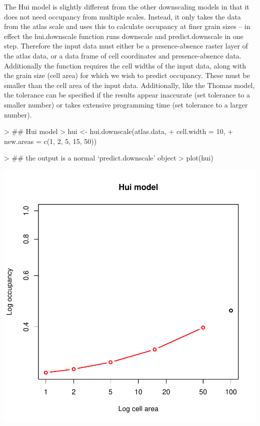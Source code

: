 \documentclass{article}[12pt, a4paper]
\begin{document}
The Hui model is slightly different from the other downscaling models in that it does not need occupancy from multiple scales. Instead, it only takes the data from the atlas scale and uses this to calculate occupancy at finer grain sizes – in effect the hui.downscale function runs downscale and predict.downscale in one step. Therefore the input data must either be a presence-absence raster layer of the atlas data, or a data frame of cell coordinates and presence-absence data. Additionally the function requires the cell widths of the input data, along with the grain size (cell area) for which we wish to predict occupancy. These must be smaller than the cell area of the input data. Additionally, like the Thomas model, the tolerance can be specified if the results appear inaccurate (set tolerance to a smaller number) or takes extensive programming time (set tolerance to a larger number).

\begin{Schunk}
\begin{Sinput}
> ## Hui model
> hui <- hui.downscale(atlas.data,
+                      cell.width = 10,
+                      new.areas = c(1, 2, 5, 15, 50))
\end{Sinput}
\end{Schunk}
\begin{Schunk}
\begin{Sinput}
> ## the output is a normal ‘predict.downscale’ object	
> plot(hui)
\end{Sinput}
\end{Schunk}
\includegraphics{Downscaling-downscale18}
\end{document}
